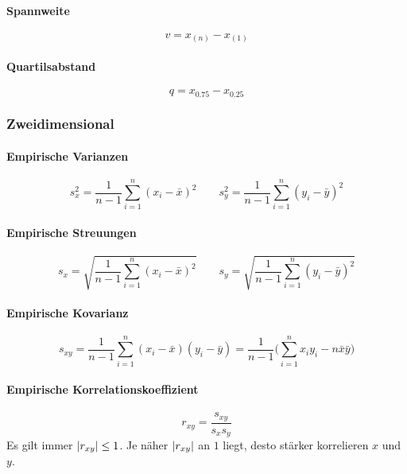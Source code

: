 				\paragraph{Spannweite}
					\begin{equation*}
						v = x_{(n)} - x_{(1)}
					\end{equation*}

				\paragraph{Quartilsabstand}
					\begin{equation*}
						q = x_{0.75} - x_{0.25}
					\end{equation*}

			\subsubsection{Zweidimensional}
				\paragraph{Empirische Varianzen}
					\begin{equation*}
						s_x^2 = \frac{1}{n - 1} \sum_{i = 1}^{n} (x_i - \bar{x})^2 \qquad s_y^2 = \frac{1}{n - 1} \sum_{i = 1}^{n} (y_i - \bar{y})^2
					\end{equation*}

				\paragraph{Empirische Streuungen}
					\begin{equation*}
						s_x = \sqrt{\frac{1}{n - 1} \sum_{i = 1}^{n} (x_i - \bar{x})^2} \qquad s_y = \sqrt{\frac{1}{n - 1} \sum_{i = 1}^{n} (y_i - \bar{y})^2}
					\end{equation*}

				\paragraph{Empirische Kovarianz}
					\begin{equation*}
						s_{xy} = \frac{1}{n - 1} \sum_{i = 1}^{n} (x_i - \bar{x}) (y_i - \bar{y}) = \frac{1}{n - 1} \Bigg( \sum_{i = 1}^n x_i y_i - n\bar{x}\bar{y} \Bigg)
					\end{equation*}

				\paragraph{Empirische Korrelationskoeffizient}
					\begin{equation*}
						r_{xy} = \frac{s_{xy}}{s_x s_y}
					\end{equation*}
					Es gilt immer \( \abs{r_{xy}} \leq 1 \). Je näher \( \abs{r_{xy}} \) an \(1\) liegt, desto stärker korrelieren \(x\) und \(y\).

